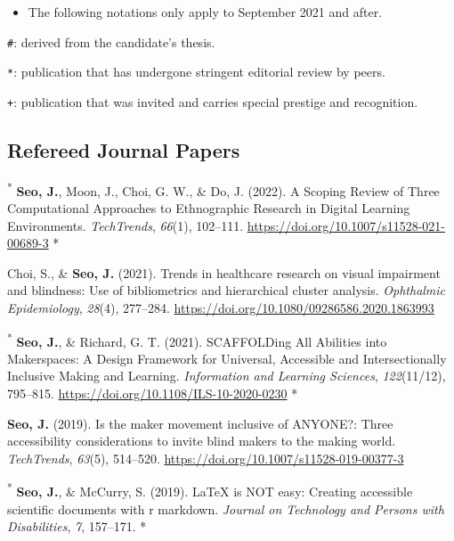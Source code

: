\documentclass[11pt,a4paper,]{awesome-cv}
\providecommand{\tightlist}{%
	\setlength{\itemsep}{0pt}\setlength{\parskip}{0pt}}
\newcommand{\CSLBlock}[1]{#1\hfill\break}
\begin{document}
\begin{itemize}
\tightlist
\item
  The following notations only apply to September 2021 and after.
\end{itemize}

\texttt{\#}: derived from the candidate's thesis.

\texttt{*}: publication that has undergone stringent editorial review by
peers.

\texttt{+}: publication that was invited and carries special prestige
and recognition.

\hypertarget{refereed-journal-papers}{%
\subsection{Refereed Journal Papers}\label{refereed-journal-papers}}

\hypertarget{refs_journals}{}
\leavevmode{}%
\textsuperscript{*} \textbf{Seo, J.}, Moon, J., Choi, G. W., \& Do, J.
(2022). A {Scoping Review} of {Three Computational Approaches} to
{Ethnographic Research} in {Digital Learning Environments}.
\emph{TechTrends}, \emph{66}(1), 102--111.
\url{https://doi.org/10.1007/s11528-021-00689-3}
\CSLBlock{*}

\leavevmode{}%
Choi, S., \& \textbf{Seo, J.} (2021). Trends in healthcare research on
visual impairment and blindness: Use of bibliometrics and hierarchical
cluster analysis. \emph{Ophthalmic Epidemiology}, \emph{28}(4),
277--284. \url{https://doi.org/10.1080/09286586.2020.1863993}

\leavevmode{}%
\textsuperscript{*} \textbf{Seo, J.}, \& Richard, G. T. (2021).
{SCAFFOLDing All Abilities} into {Makerspaces}: {A Design Framework} for
{Universal}, {Accessible} and {Intersectionally Inclusive Making} and
{Learning}. \emph{Information and Learning Sciences}, \emph{122}(11/12),
795--815. \url{https://doi.org/10.1108/ILS-10-2020-0230}
\CSLBlock{*}

\leavevmode{}%
\textbf{Seo, J.} (2019). Is the maker movement inclusive of {ANYONE}?:
Three accessibility considerations to invite blind makers to the making
world. \emph{{TechTrends}}, \emph{63}(5), 514--520.
\url{https://doi.org/10.1007/s11528-019-00377-3}

\leavevmode{}%
\textsuperscript{*} \textbf{Seo, J.}, \& McCurry, S. (2019). LaTeX is
NOT easy: Creating accessible scientific documents with r markdown.
\emph{Journal on Technology and Persons with Disabilities}, \emph{7},
157--171.
\CSLBlock{*}
\end{document}
